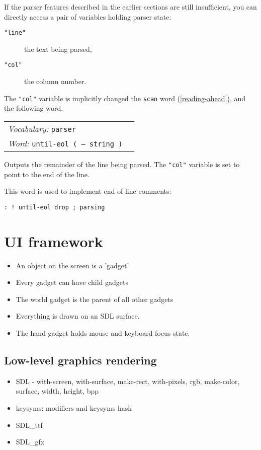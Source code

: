 \documentclass{book}
\newcommand{\vocabulary}[1]{\emph{Vocabulary:} \texttt{#1}&\\}
\newcommand{\ordinaryword}[2]{\index{\texttt{#1}}\emph{Word:} \texttt{#2}&\\}
\newcommand{\wordtable}[1]{


\begin{tabularx}{12cm}{lX}
\hline
#1
\hline
\end{tabularx}

}
\begin{document}
If the parser features described in the earlier sections are still insufficient, you can directly access a pair of variables holding parser state:
\begin{description}
\item[\texttt{"line"}] the text being parsed,
\item[\texttt{"col"}] the column number.
\end{description}
The \verb|"col"| variable is implicitly changed the \verb|scan| word (\ref{reading-ahead}), and the following word.
\wordtable{
\vocabulary{parser}
\ordinaryword{until-eol}{until-eol ( -- string )}
}
Outputs the remainder of the line being parsed. The \verb|"col"| variable is set to point to the end of the line.

This word is used to implement end-of-line comments:
\begin{verbatim}
: ! until-eol drop ; parsing
\end{verbatim}

\chapter{UI framework}\label{ui}

\begin{itemize}

\item An object on the screen is a 'gadget'

\item Every gadget can have child gadgets

\item The world gadget is the parent of all other gadgets

\item Everything is drawn on an SDL surface.

\item The hand gadget holds mouse and keyboard focus state.

\end{itemize}

\section{Low-level graphics rendering}

\begin{itemize}

\item SDL - with-screen, with-surface, make-rect, with-pixels, rgb, make-color, surface, width, height, bpp

\item keysyms: modifiers and keysyms hash

\item SDL\_ttf

\item SDL\_gfx

\end{itemize}
\end{document}
